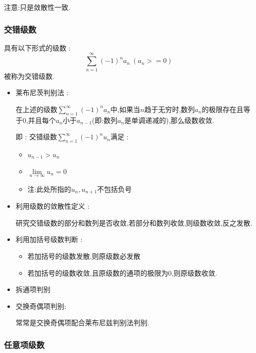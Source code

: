 \documentclass[UTF8,12pt]{ctexbook}
\newcommand{\limNormal}[1]{\lim\limits_{#1}}
\newcommand{\upDownSum}[2]{\sum\limits_{#2}^{#1}}
\newcommand{\sumSeries}{\upDownSum{\infty}{n = 1}}
\begin{document}
{{{{{\begin{itemize}
{            注意:只是敛散性一致.
            }
    \end{itemize}
  }%

  \subsubsection{交错级数}{
    具有以下形式的级数 :
    $$
      \sumSeries (-1)^na_n\ (a_n >= 0)
    $$
    被称为交错级数.

    \begin{itemize}
      \item {
            莱布尼茨判别法 :

            在上述的级数$\sumSeries (-1)^na_n$中,如果当$n$趋于无穷时,数列$a_n$的极限存在且等于$0$,并且每个$a_n$小于$a_{n-1}$(即:数列$a_n$是单调递减的),那么级数收敛.

            即 : 交错级数$\sumSeries(-1)^{n}u_n$满足 :
            \begin{itemize}
              \item $u_{n - 1} > u_n$
              \item $\limNormal{n \to \infty}u_n = 0$
              \item 注:此处所指的$u_n,u_{n + 1}$不包括负号
            \end{itemize}
            }
      \item{
            利用级数的敛散性定义 :

            研究交错级数的部分和数列是否收敛,若部分和数列收敛,则级数收敛,反之发散.
            }
      \item{
            利用加括号级数判断 :

            \begin{itemize}
              \item 若加括号的级数发散,则原级数必发散
              \item 若加括号的级数收敛,且原级数的通项的极限为$0$,则原级数收敛.
            \end{itemize}
            }
      \item 拆通项判别
      \item {
            交换奇偶项判别:

            常常是交换奇偶项配合莱布尼兹判别法判别.
            }
    \end{itemize}
  }%

  \subsubsection{任意项级数}{

}}}}}
\end{document}
